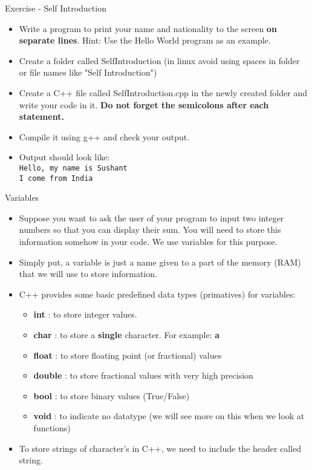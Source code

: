 \documentclass[aspectratio=169]{beamer}
\begin{document}
\begin{frame}[fragile]{Exercise - Self Introduction}
    \begin{itemize}
        \item Write a program to print your name and nationality to the screen \textbf{on separate lines}. Hint: Use the Hello World program as an example.
        \item Create a folder called SelfIntroduction (in linux avoid using spaces in folder or file names like "Self Introduction")
        \item Create a C++ file called SelfIntroduction.cpp in the newly created folder and write your code in it. \textbf{Do not forget the semicolons after each statement.}
        \item Compile it using g++ and check your output.
        \item Output should look like: \\ \verb|Hello, my name is Sushant| \\ \verb|I come from India|
    \end{itemize}
\end{frame}

\begin{frame}[fragile]{Variables}
    \begin{itemize}
        \item Suppose you want to ask the user of your program to input two integer numbers so that you can display their sum. You will need to store this information somehow in your code. We use variables for this purpose.
        \item Simply put, a variable is just a name given to a part of the memory (RAM) that we will use to store information.
        \item C++ provides some basic predefined data types (primatives) for variables:
        \begin{itemize}
            \item \textbf{int} : to store integer values.
            \item \textbf{char} : to store a \textbf{single} character. For example: \textbf{a}
            \item \textbf{float} : to store floating point (or fractional) values
            \item \textbf{double} : to store fractional values with very high precision
            \item \textbf{bool} : to store binary values (True/False)
            \item \textbf{void} : to indicate no datatype (we will see more on this when we look at functions)
        \end{itemize}
        \item To store strings of character's in C++, we need to include the header called string.
    \end{itemize}
\end{frame}
\end{document}
